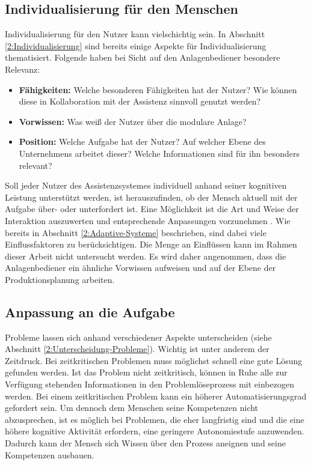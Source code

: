 \subsection{Individualisierung für den Menschen}
Individualisierung für den Nutzer kann vielschichtig sein. In Abschnitt \ref{2:Individualisierung} sind bereits einige Aspekte für Individualisierung thematisiert. Folgende haben bei Sicht auf den Anlagenbediener besondere Relevanz:
\begin{itemize}
\item \textbf{Fähigkeiten:} Welche besonderen Fähigkeiten hat der Nutzer? Wie können diese in Kollaboration mit der Assistenz sinnvoll genutzt werden?
\item \textbf{Vorwissen:} Was weiß der Nutzer über die modulare Anlage?
\item \textbf{Position:} Welche Aufgabe hat der Nutzer? Auf welcher Ebene des Unternehmens arbeitet dieser? Welche Informationen sind für ihn besonders relevant?
\end{itemize}
Soll jeder Nutzer des Assistenzsystemes individuell anhand seiner kognitiven Leistung unterstützt werden, ist herauszufinden, ob der Mensch aktuell mit der Aufgabe über- oder unterfordert ist. Eine Möglichkeit ist die Art und Weise der Interaktion auszuwerten und entsprechende Anpassungen vorzunehmen . Wie bereits in Abschnitt \ref{2:Adaptive-Systeme} beschrieben, sind dabei viele Einflussfaktoren zu berücksichtigen. Die Menge an Einflüssen kann im Rahmen dieser Arbeit nicht untersucht werden. Es wird daher angenommen, dass die Anlagenbediener ein ähnliche Vorwissen aufweisen und auf der Ebene der Produktionsplanung arbeiten.

\subsection{Anpassung an die Aufgabe}
\label{3:Anpassung-Aufgabe}
Probleme lassen sich anhand verschiedener Aspekte unterscheiden (siehe Abschnitt \ref{2:Unterscheidung-Probleme}). Wichtig ist unter anderem der Zeitdruck. Bei zeitkritischen Problemen muss möglichst schnell eine gute Lösung gefunden werden. Ist das Problem nicht zeitkritisch, können in Ruhe alle zur Verfügung stehenden Informationen in den Problemlöseprozess mit einbezogen werden. Bei einem zeitkritischen Problem kann ein höherer Automatisierungsgrad gefordert sein. Um dennoch dem Menschen seine Kompetenzen nicht abzusprechen, ist es möglich bei Problemen, die eher langfristig sind und die eine höhere kognitive Aktivität erfordern, eine geringere Autonomiestufe anzuwenden. Dadurch kann der Mensch sich Wissen über den Prozess aneignen und seine Kompetenzen ausbauen.

